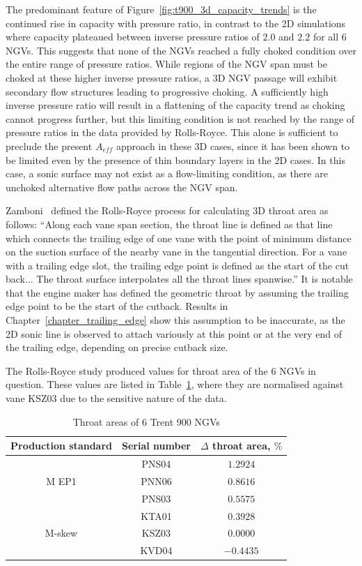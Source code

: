 \documentclass[a4paper, 11pt, oneside]{report}
\begin{document}
The predominant feature of Figure~\ref{fig:t900_3d_capacity_trends} is the continued rise in capacity with pressure ratio, in contrast to the 2D simulations where capacity plateaued between inverse pressure ratios of $2.0$ and $2.2$ for all $6$ NGVs. This suggests that none of the NGVs reached a fully choked condition over the entire range of pressure ratios. While regions of the NGV span must be choked at these higher inverse pressure ratios, a 3D NGV passage will exhibit secondary flow structures leading to progressive choking. A sufficiently high inverse pressure ratio will result in a flattening of the capacity trend as choking cannot progress further, but this limiting condition is not reached by the range of pressure ratios in the data provided by Rolls-Royce. This alone is sufficient to preclude the present $A_{eff}$ approach in these 3D cases, since it has been shown to be limited even by the presence of thin boundary layers in the 2D cases. In this case, a sonic surface may not exist as a flow-limiting condition, as there are unchoked alternative flow paths across the NGV span.

Zamboni~\cite{zamboni_area} defined the Rolls-Royce process for calculating 3D throat area as follows: ``Along each vane span section, the throat line is defined as that line which connects the trailing edge of one vane with the point of minimum distance on the suction surface of the nearby vane in the tangential direction. For a vane with a trailing edge slot, the trailing edge point is defined as the start of the cut back... The throat surface interpolates all the throat lines spanwise.'' It is notable that the engine maker has defined the geometric throat by assuming the trailing edge point to be the start of the cutback. Results in Chapter~\ref{chapter_trailing_edge} show this assumption to be inaccurate, as the 2D sonic line is observed to attach variously at this point or at the very end of the trailing edge, depending on precise cutback size.

The Rolls-Royce study produced values for throat area of the 6 NGVs in question. These values are listed in Table~\ref{T900_throat_areas}, where they are normalised against vane KSZ03 due to the sensitive nature of the data.

\begin{table}[H]
\caption{Throat areas of 6 Trent 900 NGVs}
\label{T900_throat_areas}
\begin{center}
\begin{tabular}{|c|c|c|}
\hline
Production standard & Serial number & $\Delta$ throat area, $\%$\\
\hline
\multirow{3}{*}{M EP1} & PNS04 & $1.2924$\\
 & PNN06 & $0.8616$\\
 & PNS03 & $0.5575$\\
 \hline
 \multirow{3}{*}{M-skew} & KTA01 & $0.3928$\\
 & KSZ03 & $0.0000$\\
 & KVD04 & $-0.4435$\\
\hline
\end{tabular}
\end{center}
\end{table}
\end{document}
